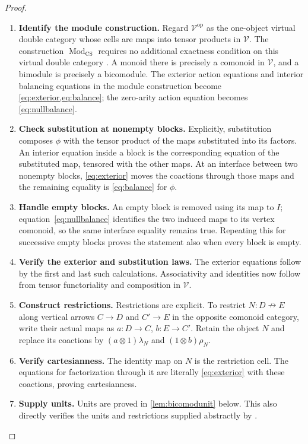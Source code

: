 \documentclass[11pt,reqno]{amsart}
\theoremstyle{plain}
\theoremstyle{definition}
\theoremstyle{remark}
\numberwithin{equation}{section}
\newcommand{\V}{\mathcal V}
\newcommand{\harr}{\mathrel{\nrightarrow}}
\newcommand{\op}{\mathrm{op}}
\newcommand{\Mod}{\operatorname{Mod}_{\mathrm{CS}}}
\begin{document}
\begin{proof}\leavevmode
\begin{enumerate}
\item \textbf{Identify the module construction.} Regard $\V^\op$ as the one-object virtual double category whose cells
are maps into tensor products in $\V$. The construction $\Mod$ requires no
additional exactness condition on this virtual double category
\cite[Section 5.3]{Leinster2004}\cite[Remark following Definition 2.8]{CruttwellShulman2010}. A monoid there is precisely a
comonoid in $\V$, and a bimodule is precisely a bicomodule. The exterior
action equations and interior balancing equations in the module
construction become \cref{eq:exterior,eq:balance}; the zero-arity
action equation becomes \cref{eq:nullbalance}.

\item \textbf{Check substitution at nonempty blocks.} Explicitly, substitution composes $\phi$ with the tensor product of the
maps substituted into its factors. An interior equation inside a block
is the corresponding equation of the substituted map, tensored with
the other maps. At an interface between two nonempty blocks,
\cref{eq:exterior} moves the coactions through those maps and the
remaining equality is \cref{eq:balance} for $\phi$.

\item \textbf{Handle empty blocks.} An empty block
is removed using its map to $I$; equation~\eqref{eq:nullbalance}
identifies the two induced maps to its vertex comonoid, so the same
interface equality remains true. Repeating this for successive empty
blocks proves the statement also when every block is empty.

\item \textbf{Verify the exterior and substitution laws.} The exterior
equations follow by the first and last such calculations. Associativity
and identities now follow from tensor functoriality and composition in
$\V$.

\item \textbf{Construct restrictions.} Restrictions are explicit. To restrict $N:D\harr E$ along vertical
arrows $C\to D$ and $C'\to E$ in the opposite comonoid category,
write their actual maps as $a:D\to C$, $b:E\to C'$. Retain the
object $N$ and replace its coactions by
$(a\otimes1)\lambda_N$ and $(1\otimes b)\rho_N$.

\item \textbf{Verify cartesianness.} The identity map on $N$ is the restriction cell. The equations for
factorization through it are literally \cref{eq:exterior} with these
coactions, proving cartesianness.

\item \textbf{Supply units.} Units are proved in
\cref{lem:bicomodunit} below. This also directly verifies the units
and restrictions supplied abstractly by
\cite[Propositions 5.5 and 7.4]{CruttwellShulman2010}.\qedhere
\end{enumerate}
\end{proof}
\end{document}

